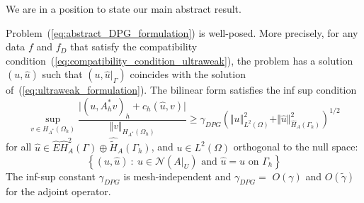 We are in a position to state our main abstract result.
\begin{theorem}
Problem~(\ref{eq:abstract_DPG_formulation}) is well-posed. More precisely, for any 
data $f$ and $f_{D}$ that satisfy the compatibility condition~(\ref{eq:compatibility_condition_ultraweak}), 
the problem has a solution $(u,\hat{u})$ such that $(u,\hat{u}\vert_\Gamma)$
coincides with the solution of~(\ref{eq:ultraweak_formulation}).
The bilinear form satisfies
the inf sup condition
\[
\sup_{v \in H_{A^\ast}(\Omega_h)} 
\frac{\vert (u,A^\ast_h v)_h + c_h(\hat{u},v) \vert}{\Vert v \Vert_{H_{A^\ast}(\Omega_h)}}
\geq \gamma_{DPG} 
\left( \Vert u \Vert_{L^2(\Omega)}^2 + \Vert \hat{u} \Vert_{\widehat{H}_A(\Gamma_h)}^2 \right)^{1/2}
\]
for all $\hat{u} \in \hat{E} \widehat{H}_A^2(\Gamma) \oplus
 \hat{\tilde{H}}_A(\Gamma_h)$, and $u \in L^2(\Omega)$ {orthogonal to the null space:}
\[
\left\{ (u,\hat{u}) \: : \: u \in \mathcal{N}(A\vert_U) \text{ and } \hat{u} = u \text{ on }\Gamma_h \right\}
\]
The inf-sup constant $\gamma_{DPG}$ is mesh-independent and
$\gamma_{DPG}=$ {$O(\gamma)$ and $O(\tilde{\gamma})$ for the adjoint operator.}
\end{theorem}
